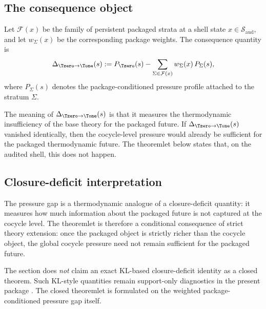 \subsection{The consequence object}

Let \(\mathcal{F}(x)\) be the family of persistent packaged strata at a shell state \(x\in \mathcal{S}_{\mathrm{aud}}\), and let \(w_{\Sigma}(x)\) be the corresponding package weights. The consequence quantity is
\[
\Delta_{\Tzero\to \Tone}(s)
:=
P_{\Tzero}(s)
-
\sum_{\Sigma\in\mathcal{F}(x)} w_{\Sigma}(x)\,P_{\Sigma}(s),
\]
where \(P_{\Sigma}(s)\) denotes the package-conditioned pressure profile attached to the stratum \(\Sigma\).

The meaning of \(\Delta_{\Tzero\to \Tone}(s)\) is that it measures the thermodynamic insufficiency of the base theory for the packaged future. If \(\Delta_{\Tzero\to \Tone}(s)\) vanished identically, then the cocycle-level pressure would already be sufficient for the packaged thermodynamic future. The theoremlet below states that, on the audited shell, this does not happen.

\subsection{Closure-deficit interpretation}

The pressure gap is a thermodynamic analogue of a closure-deficit quantity: it measures how much information about the packaged future is not captured at the cocycle level. The theoremlet is therefore a conditional consequence of strict theory extension: once the packaged object is strictly richer than the cocycle object, the global cocycle pressure need not remain sufficient for the packaged future.

The section does \emph{not} claim an exact KL-based closure-deficit identity as a closed theorem. Such KL-style quantities remain support-only diagnostics in the present package \cite{CoverThomas2006InfoTheory,TsiokosCastStone}. The closed theoremlet is formulated on the weighted package-conditioned pressure gap itself.

